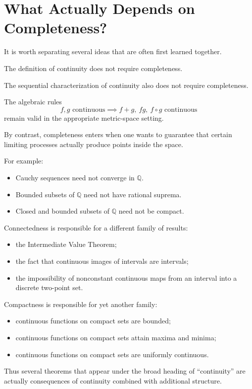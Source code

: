 \documentclass{essay}
\begin{document}
\section{What Actually Depends on Completeness?}

It is worth separating several ideas that are often first learned together.

The definition of continuity does not require completeness.

The sequential characterization of continuity also does not require
completeness.

The algebraic rules
\[ f,g\text{ continuous} \implies f+g,\ fg,\ f\circ g\text{ continuous} \]
remain valid in the appropriate metric-space setting.

By contrast, completeness enters when one wants to guarantee that certain
limiting processes actually produce points inside the space.

For example:
\begin{itemize}
  \item Cauchy sequences need not converge in \(\mathbb{Q}\).
  \item Bounded subsets of \(\mathbb{Q}\) need not have rational suprema.
  \item Closed and bounded subsets of \(\mathbb{Q}\) need not be compact.
\end{itemize}

Connectedness is responsible for a different family of results:
\begin{itemize}
  \item the Intermediate Value Theorem;
  \item the fact that continuous images of intervals are intervals;
  \item the impossibility of nonconstant continuous maps from an interval
    into a discrete two-point set.
\end{itemize}

Compactness is responsible for yet another family:
\begin{itemize}
  \item continuous functions on compact sets are bounded;
  \item continuous functions on compact sets attain maxima and minima;
  \item continuous functions on compact sets are uniformly continuous.
\end{itemize}

Thus several theorems that appear under the broad heading of ``continuity''
are actually consequences of continuity combined with additional structure.
\end{document}
